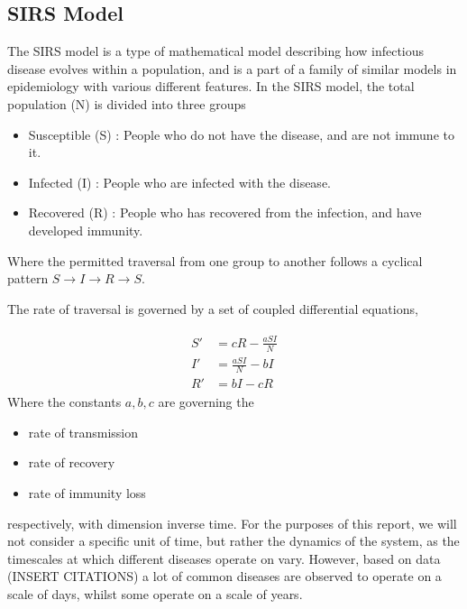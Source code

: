 \documentclass[10pt,showpacs,preprintnumbers,amsmath,amssymb,nofootinbib,aps,prl,twocolumn,groupedaddress,superscriptaddress,showkeys]{revtex4-1}
\begin{document}
  \subsection{SIRS Model}

    The SIRS model is a type of mathematical model describing how infectious disease evolves within a population, and is a part of a family of similar models in epidemiology with various different features. In the SIRS model, the total population (N) is divided into three groups

    \begin{itemize}
      \item Susceptible (S) : People who do not have the disease, and are not immune to it.
      \item Infected (I) : People who are infected with the disease.
      \item Recovered (R) : People who has recovered from the infection, and have developed immunity.
    \end{itemize}

    Where the permitted traversal from one group to another follows a cyclical pattern $S \rightarrow I \rightarrow R \rightarrow S$.

    The rate of traversal is governed by a set of coupled differential equations,

    \begin{align}
      \begin{split}
        S' &= cR - \frac{aSI}{N} \\
        I' &= \frac{aSI}{N} - bI \\
        R' &= bI - cR 
        \label{eqn:transition rates}
      \end{split}
    \end{align}
    Where the constants $a,b,c$ are governing the

    \begin{itemize}
      \item rate of transmission
      \item rate of recovery
      \item rate of immunity loss
    \end{itemize}

    respectively, with dimension inverse time. For the purposes of this report, we will not consider a specific unit of time, but rather the dynamics of the system, as the timescales at which different diseases operate on vary. However, based on data (INSERT CITATIONS) a lot of common diseases are observed to operate on a scale of days, whilst some operate on a scale of years. 
\end{document}
